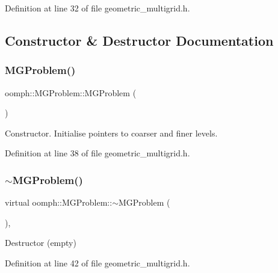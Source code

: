 Definition at line 32 of file geometric\+\_\+multigrid.\+h.



\subsection{Constructor \& Destructor Documentation}
\mbox{\label{classoomph_1_1MGProblem_a6e66372fd671f1229868616091fa25f4}} 
\subsubsection{\texorpdfstring{M\+G\+Problem()}{MGProblem()}}
{\footnotesize\ttfamily oomph\+::\+M\+G\+Problem\+::\+M\+G\+Problem (\begin{DoxyParamCaption}{ }\end{DoxyParamCaption})\hspace{0.3cm}{\ttfamily [inline]}}



Constructor. Initialise pointers to coarser and finer levels. 



Definition at line 38 of file geometric\+\_\+multigrid.\+h.

\mbox{\label{classoomph_1_1MGProblem_aefc32d5105fc72b8367891794d087a93}} 
\subsubsection{\texorpdfstring{$\sim$\+M\+G\+Problem()}{~MGProblem()}}
{\footnotesize\ttfamily virtual oomph\+::\+M\+G\+Problem\+::$\sim$\+M\+G\+Problem (\begin{DoxyParamCaption}{ }\end{DoxyParamCaption})\hspace{0.3cm}{\ttfamily [inline]}, {\ttfamily [virtual]}}



Destructor (empty) 



Definition at line 42 of file geometric\+\_\+multigrid.\+h.



